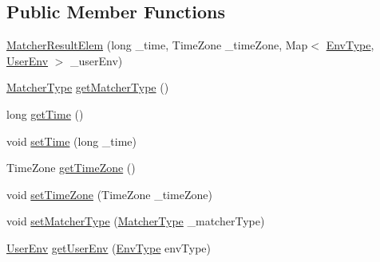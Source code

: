 \subsection*{\-Public \-Member \-Functions}
\begin{DoxyCompactItemize}
\item 
\hyperlink{classlab_1_1davidahn_1_1appshuttle_1_1predict_1_1matcher_1_1_matcher_result_elem_aa03fa745ebb8c7fbbb630afeebf43cee}{\-Matcher\-Result\-Elem} (long \-\_\-time, \-Time\-Zone \-\_\-time\-Zone, \-Map$<$ \hyperlink{enumlab_1_1davidahn_1_1appshuttle_1_1collect_1_1env_1_1_env_type}{\-Env\-Type}, \hyperlink{classlab_1_1davidahn_1_1appshuttle_1_1collect_1_1env_1_1_user_env}{\-User\-Env} $>$ \-\_\-user\-Env)
\item 
\hyperlink{enumlab_1_1davidahn_1_1appshuttle_1_1predict_1_1matcher_1_1_matcher_type}{\-Matcher\-Type} \hyperlink{classlab_1_1davidahn_1_1appshuttle_1_1predict_1_1matcher_1_1_matcher_result_elem_a9ea412aed89a8005b76f301e30e30865}{get\-Matcher\-Type} ()
\item 
long \hyperlink{classlab_1_1davidahn_1_1appshuttle_1_1predict_1_1matcher_1_1_matcher_result_elem_a13dda1ce43b6cc33074ad1d77f98dbee}{get\-Time} ()
\item 
void \hyperlink{classlab_1_1davidahn_1_1appshuttle_1_1predict_1_1matcher_1_1_matcher_result_elem_a57be72ebed2d92c1c1fadec46c385335}{set\-Time} (long \-\_\-time)
\item 
\-Time\-Zone \hyperlink{classlab_1_1davidahn_1_1appshuttle_1_1predict_1_1matcher_1_1_matcher_result_elem_aade170beba7f0d0da68a6a98621cef31}{get\-Time\-Zone} ()
\item 
void \hyperlink{classlab_1_1davidahn_1_1appshuttle_1_1predict_1_1matcher_1_1_matcher_result_elem_a9de9d6bec30cd2a1e5ab8e353f234772}{set\-Time\-Zone} (\-Time\-Zone \-\_\-time\-Zone)
\item 
void \hyperlink{classlab_1_1davidahn_1_1appshuttle_1_1predict_1_1matcher_1_1_matcher_result_elem_ae09f99c25880eae7d4b1e68565fd5fc6}{set\-Matcher\-Type} (\hyperlink{enumlab_1_1davidahn_1_1appshuttle_1_1predict_1_1matcher_1_1_matcher_type}{\-Matcher\-Type} \-\_\-matcher\-Type)
\item 
\hyperlink{classlab_1_1davidahn_1_1appshuttle_1_1collect_1_1env_1_1_user_env}{\-User\-Env} \hyperlink{classlab_1_1davidahn_1_1appshuttle_1_1predict_1_1matcher_1_1_matcher_result_elem_a362e79306ac6a9b8d0471071c1dab68d}{get\-User\-Env} (\hyperlink{enumlab_1_1davidahn_1_1appshuttle_1_1collect_1_1env_1_1_env_type}{\-Env\-Type} env\-Type)
\item 

\end{DoxyCompactItemize}
